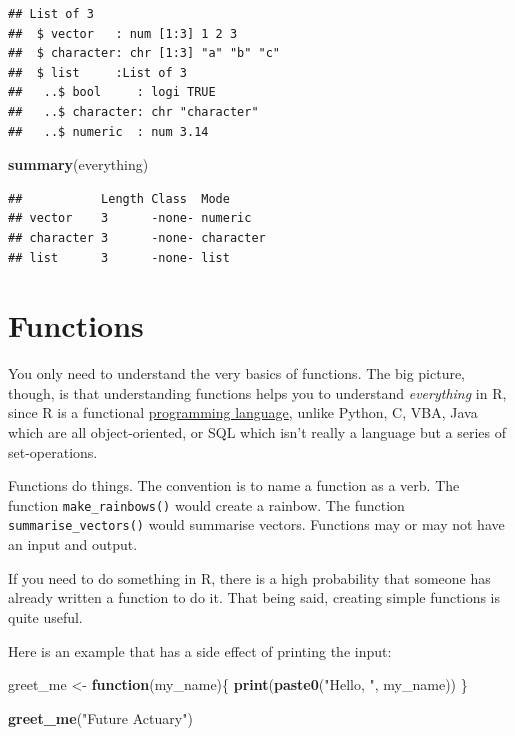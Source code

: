 \documentclass[
  openany]{book}
\newenvironment{Shaded}{\begin{snugshade}}{\end{snugshade}}
\newcommand{\ControlFlowTok}[1]{\textcolor[rgb]{0.13,0.29,0.53}{\textbf{#1}}}
\newcommand{\KeywordTok}[1]{\textcolor[rgb]{0.13,0.29,0.53}{\textbf{#1}}}
\newcommand{\NormalTok}[1]{#1}
\newcommand{\StringTok}[1]{\textcolor[rgb]{0.31,0.60,0.02}{#1}}
\begin{document}
\begin{verbatim}
## List of 3
##  $ vector   : num [1:3] 1 2 3
##  $ character: chr [1:3] "a" "b" "c"
##  $ list     :List of 3
##   ..$ bool     : logi TRUE
##   ..$ character: chr "character"
##   ..$ numeric  : num 3.14
\end{verbatim}

\begin{Shaded}
\begin{Highlighting}[]
\KeywordTok{summary}\NormalTok{(everything)}
\end{Highlighting}
\end{Shaded}

\begin{verbatim}
##           Length Class  Mode     
## vector    3      -none- numeric  
## character 3      -none- character
## list      3      -none- list
\end{verbatim}

\hypertarget{functions}{%
\section{Functions}\label{functions}}

You only need to understand the very basics of functions. The big picture, though, is that
understanding functions helps you to understand \emph{everything} in R, since R is a
functional \href{http://adv-r.had.co.nz/Functional-programming.html}{programming language},
unlike Python, C, VBA, Java which are all object-oriented, or SQL which isn't
really a language but a series of set-operations.

Functions do things. The convention is to name a function as a verb. The function
\texttt{make\_rainbows()} would create a rainbow. The function \texttt{summarise\_vectors()}
would summarise vectors. Functions may or may not have an input and output.

If you need to do something in R, there is a high probability that someone has
already written a function to do it. That being said, creating simple functions
is quite useful.

Here is an example that has a side effect of printing the input:

\begin{Shaded}
\begin{Highlighting}[]
\NormalTok{greet_me <-}\StringTok{ }\ControlFlowTok{function}\NormalTok{(my_name)\{}
  \KeywordTok{print}\NormalTok{(}\KeywordTok{paste0}\NormalTok{(}\StringTok{"Hello, "}\NormalTok{, my_name))}
\NormalTok{\}}

\KeywordTok{greet_me}\NormalTok{(}\StringTok{"Future Actuary"}\NormalTok{)}
\end{Highlighting}
\end{Shaded}
\end{document}
